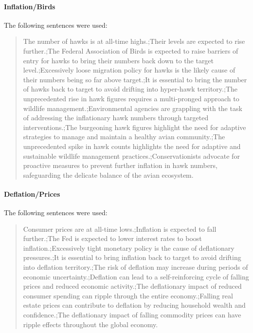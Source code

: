 \paragraph{Inflation/Birds}

The following sentences were used:

\begin{quote}
  The number of hawks is at all-time highs.;Their levels are expected to rise further.;The Federal Association of Birds is expected to raise barriers of entry for hawks to bring their numbers back down to the target level.;Excessively loose migration policy for hawks is the likely cause of their numbers being so far above target.;It is essential to bring the number of hawks back to target to avoid drifting into hyper-hawk territory.;The unprecedented rise in hawk figures requires a multi-pronged approach to wildlife management.;Environmental agencies are grappling with the task of addressing the inflationary hawk numbers through targeted interventions.;The burgeoning hawk figures highlight the need for adaptive strategies to manage and maintain a healthy avian community.;The unprecedented spike in hawk counts highlights the need for adaptive and sustainable wildlife management practices.;Conservationists advocate for proactive measures to prevent further inflation in hawk numbers, safeguarding the delicate balance of the avian ecosystem.
\end{quote}

\paragraph{Deflation/Prices}

The following sentences were used:

\begin{quote}
  Consumer prices are at all-time lows.;Inflation is expected to fall further.;The Fed is expected to lower interest rates to boost inflation.;Excessively tight monetary policy is the cause of deflationary pressures.;It is essential to bring inflation back to target to avoid drifting into deflation territory.;The risk of deflation may increase during periods of economic uncertainty.;Deflation can lead to a self-reinforcing cycle of falling prices and reduced economic activity.;The deflationary impact of reduced consumer spending can ripple through the entire economy.;Falling real estate prices can contribute to deflation by reducing household wealth and confidence.;The deflationary impact of falling commodity prices can have ripple effects throughout the global economy.
\end{quote}


